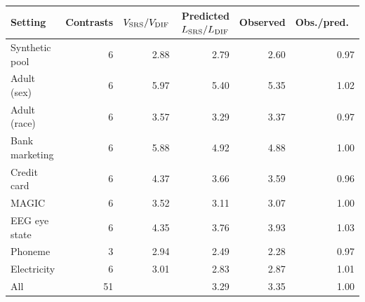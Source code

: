 \begin{tabular}{lrrrrr}\toprule
Setting & Contrasts & $V_{\rm SRS}/V_{\rm DIF}$ & Predicted $L_{\rm SRS}/L_{\rm DIF}$ & Observed & Obs./pred.\ \\\midrule
Synthetic pool & 6 & 2.88 & 2.79 & 2.60 & 0.97 \\
Adult (sex) & 6 & 5.97 & 5.40 & 5.35 & 1.02 \\
Adult (race) & 6 & 3.57 & 3.29 & 3.37 & 0.97 \\
Bank marketing & 6 & 5.88 & 4.92 & 4.88 & 1.00 \\
Credit card & 6 & 4.37 & 3.66 & 3.59 & 0.96 \\
MAGIC & 6 & 3.52 & 3.11 & 3.07 & 1.00 \\
EEG eye state & 6 & 4.35 & 3.76 & 3.93 & 1.03 \\
Phoneme & 3 & 2.94 & 2.49 & 2.28 & 0.97 \\
Electricity & 6 & 3.01 & 2.83 & 2.87 & 1.01 \\
\midrule
All & 51 & & 3.29 & 3.35 & 1.00 \\
\bottomrule\end{tabular}

